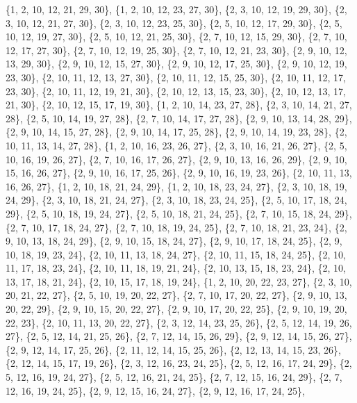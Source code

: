 \documentclass[11pt,a4paper]{article}
\begin{document}
{\{1, 2, 10, 12, 21, 29, 30\}, \{1, 2, 10, 12, 23, 27, 30\}, \{2, 3, 10, 12, 19, 29, 30\}, \{2, 3, 10, 12, 21, 27, 30\}, \{2, 3, 10, 12, 23, 25, 30\},
\{2, 5, 10, 12, 17, 29, 30\}, \{2, 5, 10, 12, 19, 27, 30\}, \{2, 5, 10, 12, 21, 25, 30\}, \{2, 7, 10, 12, 15, 29, 30\}, \{2, 7, 10, 12, 17, 27, 30\},
\{2, 7, 10, 12, 19, 25, 30\}, \{2, 7, 10, 12, 21, 23, 30\}, \{2, 9, 10, 12, 13, 29, 30\}, \{2, 9, 10, 12, 15, 27, 30\}, \{2, 9, 10, 12, 17, 25, 30\},
\{2, 9, 10, 12, 19, 23, 30\}, \{2, 10, 11, 12, 13, 27, 30\}, \{2, 10, 11, 12, 15, 25, 30\}, \{2, 10, 11, 12, 17, 23, 30\}, \{2, 10, 11, 12, 19, 21, 30\},
\{2, 10, 12, 13, 15, 23, 30\}, \{2, 10, 12, 13, 17, 21, 30\}, \{2, 10, 12, 15, 17, 19, 30\}, \{1, 2, 10, 14, 23, 27, 28\}, \{2, 3, 10, 14, 21, 27, 28\},
\{2, 5, 10, 14, 19, 27, 28\}, \{2, 7, 10, 14, 17, 27, 28\}, \{2, 9, 10, 13, 14, 28, 29\}, \{2, 9, 10, 14, 15, 27, 28\}, \{2, 9, 10, 14, 17, 25, 28\},
\{2, 9, 10, 14, 19, 23, 28\}, \{2, 10, 11, 13, 14, 27, 28\}, \{1, 2, 10, 16, 23, 26, 27\}, \{2, 3, 10, 16, 21, 26, 27\}, \{2, 5, 10, 16, 19, 26, 27\},
\{2, 7, 10, 16, 17, 26, 27\}, \{2, 9, 10, 13, 16, 26, 29\}, \{2, 9, 10, 15, 16, 26, 27\}, \{2, 9, 10, 16, 17, 25, 26\}, \{2, 9, 10, 16, 19, 23, 26\},
\{2, 10, 11, 13, 16, 26, 27\}, \{1, 2, 10, 18, 21, 24, 29\}, \{1, 2, 10, 18, 23, 24, 27\}, \{2, 3, 10, 18, 19, 24, 29\}, \{2, 3, 10, 18, 21, 24, 27\},
\{2, 3, 10, 18, 23, 24, 25\}, \{2, 5, 10, 17, 18, 24, 29\}, \{2, 5, 10, 18, 19, 24, 27\}, \{2, 5, 10, 18, 21, 24, 25\}, \{2, 7, 10, 15, 18, 24, 29\},
\{2, 7, 10, 17, 18, 24, 27\}, \{2, 7, 10, 18, 19, 24, 25\}, \{2, 7, 10, 18, 21, 23, 24\}, \{2, 9, 10, 13, 18, 24, 29\}, \{2, 9, 10, 15, 18, 24, 27\},
\{2, 9, 10, 17, 18, 24, 25\}, \{2, 9, 10, 18, 19, 23, 24\}, \{2, 10, 11, 13, 18, 24, 27\}, \{2, 10, 11, 15, 18, 24, 25\}, \{2, 10, 11, 17, 18, 23, 24\},
\{2, 10, 11, 18, 19, 21, 24\}, \{2, 10, 13, 15, 18, 23, 24\}, \{2, 10, 13, 17, 18, 21, 24\}, \{2, 10, 15, 17, 18, 19, 24\}, \{1, 2, 10, 20, 22, 23, 27\},
\{2, 3, 10, 20, 21, 22, 27\}, \{2, 5, 10, 19, 20, 22, 27\}, \{2, 7, 10, 17, 20, 22, 27\}, \{2, 9, 10, 13, 20, 22, 29\}, \{2, 9, 10, 15, 20, 22, 27\},
\{2, 9, 10, 17, 20, 22, 25\}, \{2, 9, 10, 19, 20, 22, 23\}, \{2, 10, 11, 13, 20, 22, 27\}, \{2, 3, 12, 14, 23, 25, 26\}, \{2, 5, 12, 14, 19, 26, 27\},
\{2, 5, 12, 14, 21, 25, 26\}, \{2, 7, 12, 14, 15, 26, 29\}, \{2, 9, 12, 14, 15, 26, 27\}, \{2, 9, 12, 14, 17, 25, 26\}, \{2, 11, 12, 14, 15, 25, 26\},
\{2, 12, 13, 14, 15, 23, 26\}, \{2, 12, 14, 15, 17, 19, 26\}, \{2, 3, 12, 16, 23, 24, 25\}, \{2, 5, 12, 16, 17, 24, 29\}, \{2, 5, 12, 16, 19, 24, 27\},
\{2, 5, 12, 16, 21, 24, 25\}, \{2, 7, 12, 15, 16, 24, 29\}, \{2, 7, 12, 16, 19, 24, 25\}, \{2, 9, 12, 15, 16, 24, 27\}, \{2, 9, 12, 16, 17, 24, 25\},
}
\end{document}
